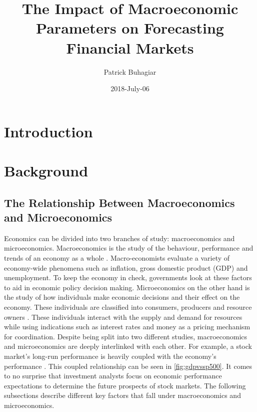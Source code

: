 \documentclass{UoYCSproject}
\author{Patrick Buhagiar}
\title{The Impact of Macroeconomic Parameters on Forecasting Financial Markets}
\date{2018-July-06}
\begin{document}
\maketitle

\listoffigures
\listoftables

\label{sec:start}
\thispagestyle{empty}\cleardoublepage

\chapter{Introduction}
\label{cha:introduction}



\chapter{Background}
\label{cha:background}

\section{The Relationship Between Macroeconomics and Microeconomics}
Economics can be divided into two branches of study: macroeconomics and microeconomics. Macroeconomics is the study of the behaviour, performance and trends of an economy as a whole \cite{2003economics}. Macro-economists evaluate a variety of economy-wide phenomena such as inflation, gross domestic product (GDP) and unemployment. To keep the economy in check, governments look at these factors to aid in economic policy decision making. Microeconomics on the other hand is the study of how individuals make economic decisions and their effect on the economy. These individuals are classified into consumers, producers and resource owners \cite{dwivedi2002microeconomics}. These individuals interact with the supply and demand for resources while using indications such as interest rates and money as a pricing mechanism for coordination.  Despite being split into two different studies, macroeconomics and microeconomics are deeply interlinked with each other. For example, a stock market's long-run performance is heavily coupled with the economy's performance \cite{davis2008macroeconomic}. This coupled relationship can be seen in \ref{fig:gdpvssp500}. It comes to no surprise that investment analysts focus on economic performance expectations to determine the future prospects of stock markets. The following subsections describe different key factors that fall under macroeconomics and microeconomics.
\end{document}
